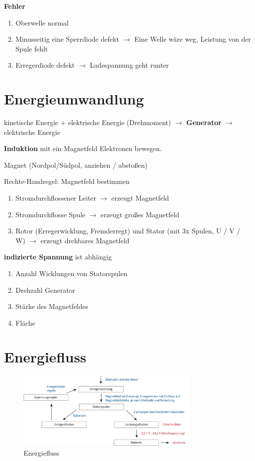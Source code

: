 \textbf{Fehler}

\begin{enumerate}
\item
  Oberwelle normal
\item
  Minusseitig eine Sperrdiode defekt $\to$ Eine Welle wäre weg,
  Leistung von der Spule fehlt
\item
  Erregerdiode defekt $\to$ Ladespannung geht runter
\end{enumerate}

\section{Energieumwandlung}\label{energieumwandlung}

kinetische Energie + elektrische Energie (Drehmoment) $\to$
\textbf{Generator} $\to$ elektrische Energie

\textbf{Induktion} mit ein Magnetfeld Elektronen bewegen.

Magnet (Nordpol/Südpol, anziehen / abstoßen)

Rechte-Handregel: Magnetfeld bestimmen

\begin{enumerate}
\item
  Stromdurchflossener Leiter $\to$ erzeugt Magnetfeld
\item
  Stromdurchflosse Spule $\to$ erzeugt großes Magnetfeld
\item
  Rotor (Erregerwicklung, Fremderregt) und Stator (mit 3x Spulen, U / V
  / W) $\to$ erzeugt drehbares Magnetfeld
\end{enumerate}

\textbf{indizierte Spannung} ist abhängig

\begin{enumerate}
\item
  Anzahl Wicklungen von Statorspulen
\item
  Drehzahl Generator
\item
  Stärke des Magnetfeldes
\item
  Fläche
\end{enumerate}

\newpage

\section{Energiefluss}\label{energiefluss}

\begin{figure}[!ht]%
\centering
\includegraphics[width=0.8\textwidth]{images/Generator/Generator-Energiefluss.pdf}
\caption{Energiefluss}
\end{figure}

